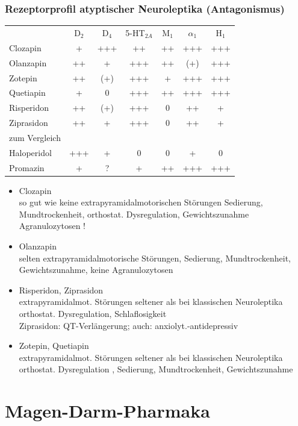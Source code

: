 \documentclass[10pt,a4paper]{report}
\begin{document}
\subsection{Rezeptorprofil atyptischer Neuroleptika (Antagonismus)} %
\label{sub:rezeptorprofil_atyptischer_neuroleptika_}
\begin{tabularx}{\textwidth}{lcccccc}
&D$_2$&D$_4$&5-HT$_{2A}$&M$_1$&$\alpha_1$&H$_1$\\	
Clozapin&+&+++&++&++&+++&+++\\
Olanzapin&++&+&+++&++&(+)&+++\\
Zotepin&++&(+)&+++&+&+++&+++\\
Quetiapin&+&0&+++&++&+++&+++\\
Risperidon&++&(+)&+++&0&++&+\\
Ziprasidon&++&+&+++&0&++&+\\
zum Vergleich\\
Haloperidol&+++&+&0&0&+&0\\
Promazin&+&?&+&++&+++&+++\\
\end{tabularx}
\begin{itemize}
	\item Clozapin\\
	so gut wie keine extrapyramidalmotorischen Störungen
	Sedierung, Mundtrockenheit, orthostat. Dysregulation, Gewichtszunahme Agranulozytosen !
	\item Olanzapin\\
	selten extrapyramidalmotorische Störungen, Sedierung, Mundtrockenheit, Gewichtszunahme, keine Agranulozytosen
	\item Risperidon, Ziprasidon\\
	extrapyramidalmot. Störungen seltener als bei klassischen Neuroleptika orthostat. Dysregulation, Schlaflosigkeit \\
	Ziprasidon: QT-Verlängerung; auch: anxiolyt.-antidepressiv
	\item Zotepin, Quetiapin\\
	extrapyramidalmot. Störungen seltener als bei klassischen Neuroleptika
	orthostat. Dysregulation , Sedierung, Mundtrockenheit, Gewichtszunahme
\end{itemize}
\chapter{Magen-Darm-Pharmaka} %
\label{cha:magen_darm_pharmaka}
\end{document}
